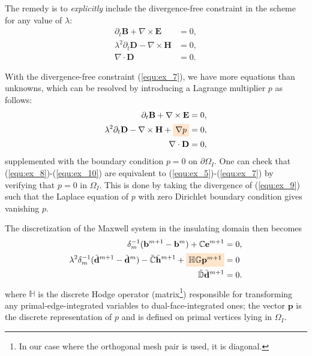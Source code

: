 \documentclass{report}
\begin{document}
The remedy is to \emph{explicitly} include the divergence-free constraint in the scheme for any value of $\lambda$:  
\begin{align}
    \partial_t \mathbf{B} + \nabla \times \mathbf{E} &= 0, \label{equ:ex_5}\\ 
    \lambda^2 \partial_t \mathbf{D} - \nabla \times \mathbf{H} &= 0,  \label{equ:ex_6}\\
    \nabla \cdot \mathbf{D} &= 0 \label{equ:ex_7}.
\end{align}

With the divergence-free constraint (\ref{equ:ex_7}), we have more equations than unknowns, which can be resolved by introducing a Lagrange multiplier $p$ as follows:
\begin{align}
    \partial_t \mathbf{B} + \nabla \times \mathbf{E} &= 0, \label{equ:ex_8}\\ 
    \lambda^2 \partial_t \mathbf{D} - \nabla \times \mathbf{H} + \colorbox{orange!20}{$\nabla p$} &= 0,  \label{equ:ex_9}\\
    \nabla \cdot \mathbf{D} &= 0 \label{equ:ex_10},
\end{align}
supplemented with the boundary condition $p = 0$ on $\partial\Omega_I$. One can check that (\ref{equ:ex_8})-(\ref{equ:ex_10}) are equivalent to (\ref{equ:ex_5})-(\ref{equ:ex_7}) by verifying that $p = 0$ in $\Omega_I$. This is done by taking the divergence of (\ref{equ:ex_9}) such that the Laplace equation of $p$ with zero Dirichlet boundary condition gives vanishing $p$. 

The discretization of the Maxwell system in the insulating domain then becomes
\begin{align*}
    \delta_m^{-1} (\mathbf{b}^{m+1} - \mathbf{b}^m) + \mathbb{C}\mathbf{e}^{m+1} &= 0, \\
    \lambda^2\delta_m^{-1} (\Tilde{\mathbf{d}}^{m+1} - \Tilde{\mathbf{d}}^m) - \Tilde{\mathbb{C}}\Tilde{\mathbf{h}}^{m+1} + \colorbox{orange!20}{$\mathbb{H} \mathbb{G} \mathbf{p}^{m+1}$} &= 0 \\
    \Tilde{\mathbb{D}} \Tilde{\mathbf{d}}^{m+1} &= 0.
\end{align*}
where $\mathbb{H}$ is the discrete Hodge operator (matrix\footnote{In our case where the orthogonal mesh pair is used, it is diagonal.}) responsible for transforming any primal-edge-integrated variables to dual-face-integrated ones; the vector $\mathbf{p}$ is the discrete representation of $p$ and is defined on primal vertices lying in $\Omega_I$.
\end{document}
